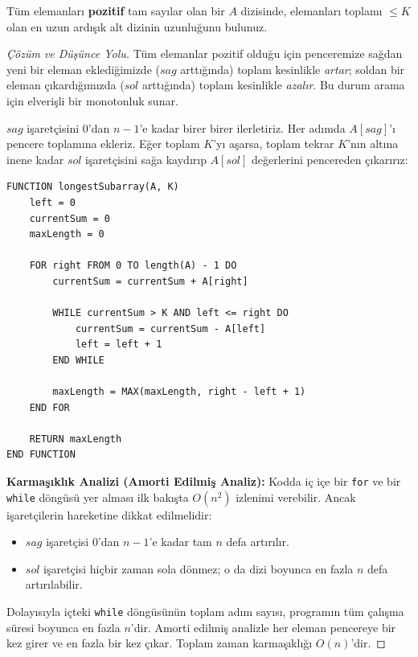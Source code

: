 \begin{example}
Tüm elemanları \textbf{pozitif} tam sayılar olan bir $A$ dizisinde, elemanları toplamı $\le K$ olan en uzun ardışık alt dizinin uzunluğunu bulunuz.
\end{example}

\begin{proof}[Çözüm ve Düşünce Yolu]
Tüm elemanlar pozitif olduğu için penceremize sağdan yeni bir eleman eklediğimizde ($sag$ arttığında) toplam kesinlikle \emph{artar}; soldan bir eleman çıkardığımızda ($sol$ arttığında) toplam kesinlikle \emph{azalır}. Bu durum arama için elverişli bir monotonluk sunar.

$sag$ işaretçisini $0$'dan $n-1$'e kadar birer birer ilerletiriz. Her adımda $A[sag]$'ı pencere toplamına ekleriz. Eğer toplam $K$'yı aşarsa, toplam tekrar $K$'nın altına inene kadar $sol$ işaretçisini sağa kaydırıp $A[sol]$ değerlerini pencereden çıkarırız:

\begin{lstlisting}
FUNCTION longestSubarray(A, K)
    left = 0
    currentSum = 0
    maxLength = 0

    FOR right FROM 0 TO length(A) - 1 DO
        currentSum = currentSum + A[right]

        WHILE currentSum > K AND left <= right DO
            currentSum = currentSum - A[left]
            left = left + 1
        END WHILE

        maxLength = MAX(maxLength, right - left + 1)
    END FOR

    RETURN maxLength
END FUNCTION\end{lstlisting}

\textbf{Karmaşıklık Analizi (Amorti Edilmiş Analiz):} 
Kodda iç içe bir \texttt{for} ve bir \texttt{while} döngüsü yer alması ilk bakışta $O(n^2)$ izlenimi verebilir. Ancak işaretçilerin hareketine dikkat edilmelidir: 
\begin{itemize}
    \item $sag$ işaretçisi $0$'dan $n-1$'e kadar tam $n$ defa artırılır.
    \item $sol$ işaretçisi hiçbir zaman sola dönmez; o da dizi boyunca en fazla $n$ defa artırılabilir.
\end{itemize}
Dolayısıyla içteki \texttt{while} döngüsünün toplam adım sayısı, programın tüm çalışma süresi boyunca en fazla $n$'dir. Amorti edilmiş analizle her eleman pencereye bir kez girer ve en fazla bir kez çıkar. Toplam zaman karmaşıklığı $O(n)$'dir.
\end{proof}

